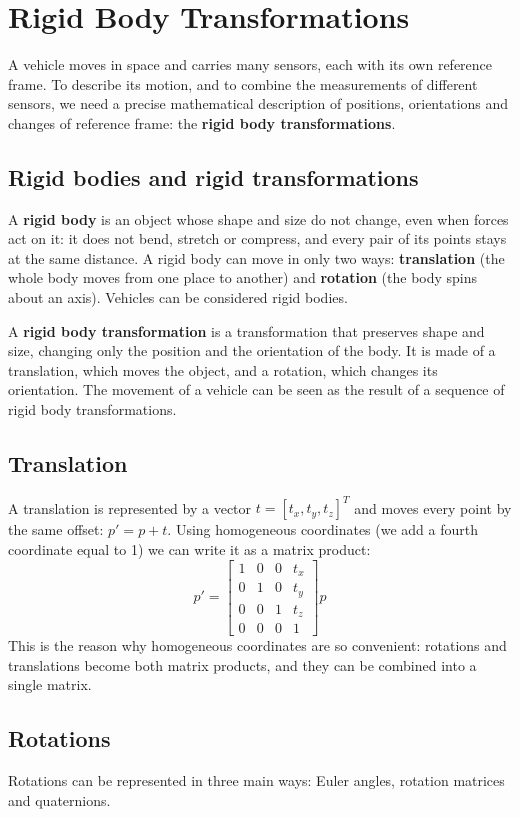 \section{Rigid Body Transformations}

A vehicle moves in space and carries many sensors, each with its own reference frame.
To describe its motion, and to combine the measurements of different sensors, we need a precise mathematical description of positions, orientations and changes of reference frame: the \textbf{rigid body transformations}.

\subsection{Rigid bodies and rigid transformations}
A \textbf{rigid body} is an object whose shape and size do not change, even when forces act on it: it does not bend, stretch or compress, and every pair of its points stays at the same distance.
A rigid body can move in only two ways: \textbf{translation} (the whole body moves from one place to another) and \textbf{rotation} (the body spins about an axis).
Vehicles can be considered rigid bodies.

A \textbf{rigid body transformation} is a transformation that preserves shape and size, changing only the position and the orientation of the body. It is made of a translation, which moves the object, and a rotation, which changes its orientation.
The movement of a vehicle can be seen as the result of a sequence of rigid body transformations.

\subsection{Translation}
A translation is represented by a vector $t = [t_x, t_y, t_z]^T$ and moves every point by the same offset: $p' = p + t$.
Using homogeneous coordinates (we add a fourth coordinate equal to 1) we can write it as a matrix product:
\[
p' = \begin{bmatrix} 1 & 0 & 0 & t_x \\ 0 & 1 & 0 & t_y \\ 0 & 0 & 1 & t_z \\ 0 & 0 & 0 & 1 \end{bmatrix} p
\]
This is the reason why homogeneous coordinates are so convenient: rotations and translations become both matrix products, and they can be combined into a single matrix.

\subsection{Rotations}
Rotations can be represented in three main ways: Euler angles, rotation matrices and quaternions.

